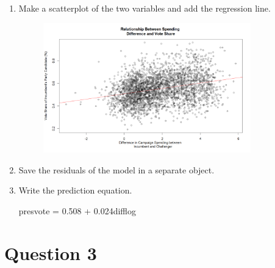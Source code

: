 \documentclass[12pt,letterpaper]{article}
\begin{document}
\begin{enumerate}
		\newpage
		\item Make a scatterplot of the two variables and add the regression line. 
			
				\begin{figure}[h!]
			\centering
			\caption{\footnotesize}
			\label{fig:plot_2}
			\includegraphics[width=0.85\textwidth]{Plot2}  
		\end{figure}	\vspace{2cm}
		\item Save the residuals of the model in a separate object. 	\vspace{0.5cm}
		\item Write the prediction equation.
		\noindent 
		
		presvote = 0.508 + 0.024difflog 
	\end{enumerate}
	
	\newpage	
\section*{Question 3}
\end{document}

